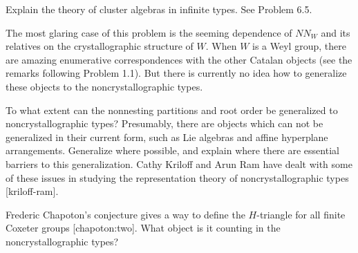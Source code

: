 \documentclass[12pt,letterpaper, reqno]{amsart}
\begin{document}
\begin{problemblock}
\begin{remark}
Explain the theory of cluster algebras in infinite types. See Problem 6.5.
\end{remark}

\begin{remark}
 The most glaring case of this problem is the seeming dependence of $NN_W$ and its relatives on the crystallographic structure of $W$. When $W$ is a Weyl group, there are amazing enumerative correspondences with the other Catalan objects (see the remarks following Problem 1.1). But there is currently no idea how to generalize these objects to the noncrystallographic types.

To what extent can the nonnesting partitions and root order be generalized to noncrystallographic types? Presumably, there are objects which can not be generalized in their current form, such as Lie algebras and affine hyperplane arrangements. Generalize where possible, and explain where there are essential barriers to this generalization. Cathy Kriloff and Arun Ram have dealt with some of these issues in studying the representation theory of noncrystallographic types [kriloff-ram].

Frederic Chapoton's conjecture gives a way to define the $H$-triangle for all finite Coxeter groups [chapoton:two]. What object is it counting in the noncrystallographic types?
\end{remark}

\end{problemblock}
\end{document}
